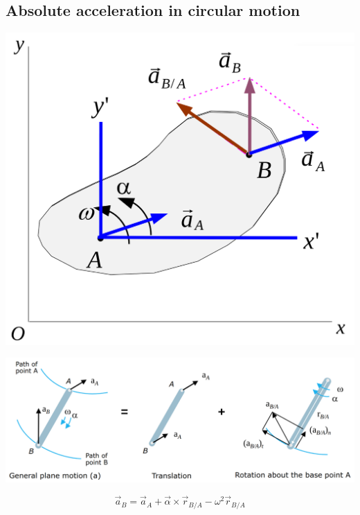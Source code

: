 \documentclass[11pt]{article}
\begin{document}
\subsection{Absolute acceleration in circular motion}
\label{sec:org1648ba4}
\begin{center}
\includegraphics[width=.9\linewidth]{./images/planar-motion-of-a-rigid-slab-acceleration.png}
\end{center}
\begin{center}
\includegraphics[width=.9\linewidth]{./images/relative-motion-analysis-acceleration.png}
\end{center}
\[\vec{a}_B = \vec{a}_A + \vec{\alpha} \times \vec{r}_{B/A} - \omega^2 \vec{r}_{B/A}\]

 \newpage
\end{document}

